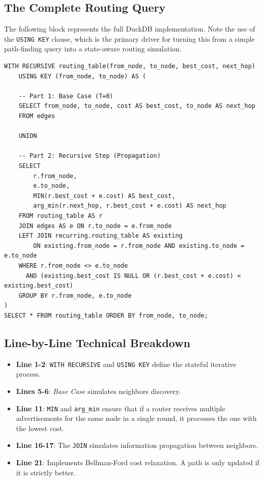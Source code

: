 \documentclass[twocolumn,a4paper,10pt]{article}
\begin{document}
\subsection{The Complete Routing Query}
The following block represents the full DuckDB implementation. Note the use of the \texttt{USING KEY} clause, which is the primary driver for turning this from a simple path-finding query into a state-aware routing simulation.

\begin{lstlisting}[caption={Complete DuckDB Implementation}]
WITH RECURSIVE routing_table(from_node, to_node, best_cost, next_hop) 
    USING KEY (from_node, to_node) AS (
    
    -- Part 1: Base Case (T=0)
    SELECT from_node, to_node, cost AS best_cost, to_node AS next_hop
    FROM edges

    UNION

    -- Part 2: Recursive Step (Propagation)
    SELECT
        r.from_node,
        e.to_node,
        MIN(r.best_cost + e.cost) AS best_cost,
        arg_min(r.next_hop, r.best_cost + e.cost) AS next_hop
    FROM routing_table AS r
    JOIN edges AS e ON r.to_node = e.from_node
    LEFT JOIN recurring.routing_table AS existing 
        ON existing.from_node = r.from_node AND existing.to_node = e.to_node
    WHERE r.from_node <> e.to_node
      AND (existing.best_cost IS NULL OR (r.best_cost + e.cost) < existing.best_cost)
    GROUP BY r.from_node, e.to_node
)
SELECT * FROM routing_table ORDER BY from_node, to_node;
\end{lstlisting}

\subsection{Line-by-Line Technical Breakdown}
\begin{itemize}
    \item \textbf{Line 1-2}: \texttt{WITH RECURSIVE} and \texttt{USING KEY} define the stateful iterative process.
    \item \textbf{Lines 5-6}: \textit{Base Case} simulates neighbors discovery.
    \item \textbf{Line 11}: \texttt{MIN} and \texttt{arg\_min} ensure that if a router receives multiple advertisements for the same node in a single round, it processes the one with the lowest cost.
    \item \textbf{Line 16-17}: The \texttt{JOIN} simulates information propagation between neighbors.
    \item \textbf{Line 21}: Implements Bellman-Ford cost relaxation. A path is only updated if it is strictly better.
\end{itemize}
\end{document}
